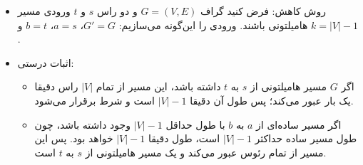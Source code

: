 \begin{itemize}
    \item {روش کاهش:} فرض کنید گراف $G=(V, E)$ و دو راس $s$ و $t$ ورودی مسیر هامیلتونی باشند. ورودی  را این‌گونه می‌سازیم: $G' = G$، $a = s$، $b = t$ و $k = |V| - 1$.

    \item {اثبات درستی:}
    \begin{itemize}
        \item اگر $G$ مسیر هامیلتونی از $s$ به $t$ داشته باشد، این مسیر از تمام $|V|$ راس دقیقا یک بار عبور می‌کند؛ پس طول آن دقیقا $|V| - 1$ است و شرط  برقرار می‌شود.
        \item اگر مسیر ساده‌ای از $a$ به $b$ با طول حداقل $|V| - 1$ وجود داشته باشد، چون طول مسیر ساده حداکثر $|V| - 1$ است، طول دقیقا $|V| - 1$ خواهد بود. پس این مسیر از تمام رئوس عبور می‌کند و یک مسیر هامیلتونی از $s$ به $t$ است.
    \end{itemize}
\end{itemize}
